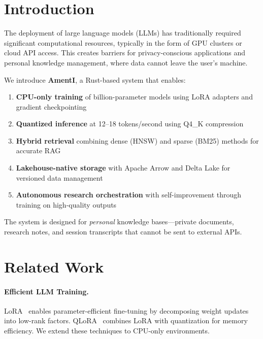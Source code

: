 \documentclass[11pt,a4paper]{article}
\theoremstyle{plain}
\theoremstyle{definition}
\begin{document}
\section{Introduction}
\label{sec:intro}

The deployment of large language models (LLMs) has traditionally required
significant computational resources, typically in the form of GPU clusters
or cloud API access. This creates barriers for privacy-conscious applications
and personal knowledge management, where data cannot leave the user's machine.

We introduce \textbf{AmentI}, a Rust-based system that enables:

\begin{enumerate}
    \item \textbf{CPU-only training} of billion-parameter models using LoRA
          adapters and gradient checkpointing
    \item \textbf{Quantized inference} at 12--18 tokens/second using Q4\_K
          compression
    \item \textbf{Hybrid retrieval} combining dense (HNSW) and sparse (BM25)
          methods for accurate RAG
    \item \textbf{Lakehouse-native storage} with Apache Arrow and Delta Lake
          for versioned data management
    \item \textbf{Autonomous research orchestration} with self-improvement
          through training on high-quality outputs
\end{enumerate}

The system is designed for \emph{personal} knowledge bases---private documents,
research notes, and session transcripts that cannot be sent to external APIs.

\section{Related Work}
\label{sec:related}

\paragraph{Efficient LLM Training.}
LoRA~\cite{hu2022lora} enables parameter-efficient fine-tuning by decomposing
weight updates into low-rank factors. QLoRA~\cite{dettmers2023qlora} combines
LoRA with quantization for memory efficiency. We extend these techniques to
CPU-only environments.
\end{document}

